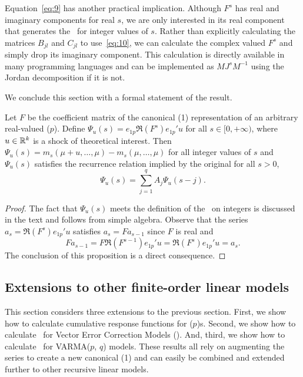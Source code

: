 \documentclass[12pt,fleqn]{article}
\begin{document}
Equation~\eqref{eq:9} has another practical implication. Although
$F^s$ has real and imaginary components for real $s$, we are only
interested in its real component that generates the \IRFs\ for integer
values of $s$. Rather than explicitly calculating the matrices
$B_{jl}$ and $C_{jl}$ to use~\eqref{eq:10}, we can calculate the
complex valued $F^s$ and simply drop its imaginary component. This
calculation is directly available in many programming languages and
can be implemented as $M J^s M^{-1}$ using the Jordan decomposition if
it is not.

We conclude this section with a formal statement of the result.

\begin{proposition}
  \label{P1}
  Let $F$ be the coefficient matrix of the canonical \VAR(1)
  representation of an arbitrary real-valued \VAR($p$). Define
  $\Psi_u(s) = e_{1p} \Re(F^s) e_{1p}' u$ for all $s \in [0,+\infty)$, where
  $u \in \mathbb{R}^k$ is a shock of theoretical interest. Then
  $\Psi_u(s) = m_s(\mu + u, \dots, \mu) - m_s(\mu,\dots,\mu)$ for all
  integer values of $s$ and $\Psi_u(s)$ satisfies the recurrence
  relation implied by the original \VAR for all $s > 0$,
  \begin{equation}
    \label{eq:11}
    \Psi_u(s) = \sum_{j=1}^q A_j \Psi_u(s-j).
  \end{equation}
\end{proposition}
\begin{proof}
  The fact that $\Psi_u(s)$ meets the definition of the \IRF\ on
  integers is discussed in the text and follows from simple
  algebra. Observe that the series $a_s = \Re(F^s) e_{1p}'u$ satisfies
  $a_s = F a_{s-1}$ since $F$ is real and
  \[
    F a_{s-1} = F \Re(F^{s-1}) e_{1p}'u
    = \Re(F^s) e_{1p}'u
    = a_s.
  \]
  The conclusion of this proposition is a direct consequence.
\end{proof}

\subsection[Finite-order linear models]{Extensions to other finite-order linear models}
\label{S2.3}

This section considers three extensions to the previous section.
First, we show how to calculate cumulative response functions for
\VAR($p$)s. Second, we show how to calculate \IRFs\ for Vector Error
Correction Models (\VECM). And, third, we show how to calculate \IRFs\
for VARMA($p$, $q$) models. These results all rely on augmenting the
series to create a new canonical \VAR(1) and can easily be combined
and extended further to other recursive linear models.
\end{document}
